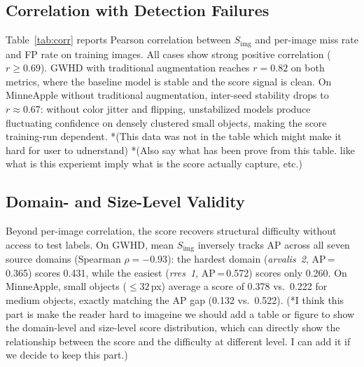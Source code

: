 \documentclass[conference]{IEEEtran}
\begin{document}
\subsection{Correlation with Detection Failures}

Table~\ref{tab:corr} reports Pearson correlation between
$S_{\mathrm{img}}$ and per-image miss rate and FP rate on training
images. All cases show strong positive correlation ($r \ge 0.69$).
GWHD with traditional augmentation reaches $r{=}0.82$ on both
metrics, where the baseline model is stable and the score signal is
clean. On MinneApple without traditional augmentation, inter-seed
stability drops to $r{\approx}0.67$: without color jitter and
flipping, unstabilized models produce fluctuating confidence on
densely clustered small objects, making the score training-run
dependent. *(This data was not in the table which might make it hard for user to udnerstand) 
*(Also say what has been prove from this table. like what is this experiemt imply 
what is the score actually capture, etc.)

\begin{table}[t]
\centering
\caption{Pearson correlation of $S_{\mathrm{img}}$ with per-image
miss rate and FP rate (training set, w/ traditional augmentation).}
\label{tab:corr}
\end{table}

\subsection{Domain- and Size-Level Validity}

Beyond per-image correlation, the score recovers structural
difficulty without access to test labels. On GWHD, mean
$S_{\mathrm{img}}$ inversely tracks AP across all seven source
domains (Spearman $\rho = -0.93$): the hardest domain
(\textit{arvalis~2}, AP\,=\,0.365) scores 0.431, while the
easiest (\textit{rres~1}, AP\,=\,0.572) scores only 0.260.
On MinneApple, small objects (${\le}32$\,px) average a score
of 0.378 vs.\ 0.222 for medium objects, exactly matching the AP
gap (0.132 vs.\ 0.522). (*I think this part is make the reader hard to imageine
we should add a table or figure to show the domain-level and size-level score distribution, which can directly show the relationship between the score and the difficulty at different level. I can add it if we decide to keep this part.)
\end{document}
